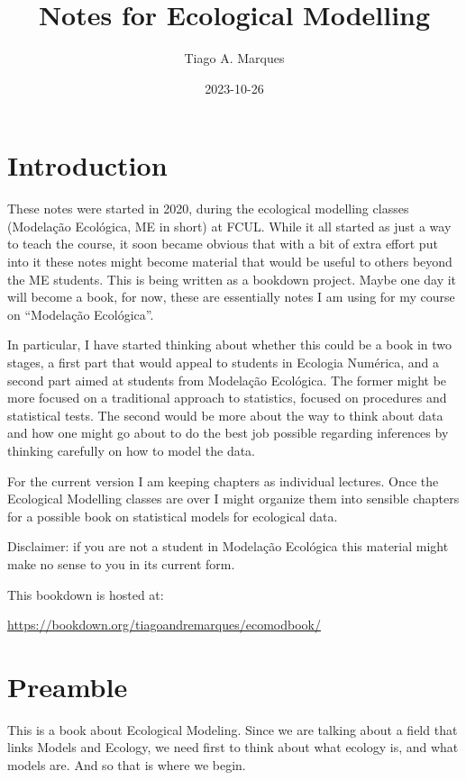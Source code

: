 \documentclass[
]{book}
\title{Notes for Ecological Modelling}
\author{Tiago A. Marques}
\date{2023-10-26}
\begin{document}
\maketitle

{
\setcounter{tocdepth}{1}
\tableofcontents
}
\hypertarget{introduction}{%
\chapter{Introduction}\label{introduction}}

These notes were started in 2020, during the ecological modelling classes (Modelação Ecológica, ME in short) at FCUL. While it all started as just a way to teach the course, it soon became obvious that with a bit of extra effort put into it these notes might become material that would be useful to others beyond the ME students. This is being written as a bookdown project. Maybe one day it will become a book, for now, these are essentially notes I am using for my course on ``Modelação Ecológica''.

In particular, I have started thinking about whether this could be a book in two stages, a first part that would appeal to students in Ecologia Numérica, and a second part aimed at students from Modelação Ecológica. The former might be more focused on a traditional approach to statistics, focused on procedures and statistical tests. The second would be more about the way to think about data and how one might go about to do the best job possible regarding inferences by thinking carefully on how to model the data.

For the current version I am keeping chapters as individual lectures. Once the Ecological Modelling classes are over I might organize them into sensible chapters for a possible book on statistical models for ecological data.

Disclaimer: if you are not a student in Modelação Ecológica this material might make no sense to you in its current form.

This bookdown is hosted at:

\url{https://bookdown.org/tiagoandremarques/ecomodbook/}

\hypertarget{mainintro}{%
\chapter{Preamble}\label{mainintro}}

This is a book about Ecological Modeling. Since we are talking about a field that links Models and Ecology, we need first to think about what ecology is, and what models are. And so that is where we begin.
\end{document}
